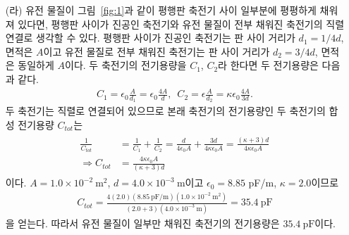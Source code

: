 \documentclass[tightenlines,floatfix,nofootinbib,superscriptaddress,fleqn]{revtex4-2}
\begin{document}
\begin{itemize}
  \item[(라)] 유전 물질이 그림~\ref{fig:1}과 같이 평행판 축전기 사이 일부분에 평평하게 
  채워져 있다면, 평행판 사이가 진공인
  축전기와 유전 물질이 전부 채워진 축전기의 직렬 연결로 생각할 수 있다. 평행판 사이가
  진공인 축전기는 판 사이 거리가 $d_1 = 1/4d$, 면적은 $A$이고 유전 물질로 전부 채워진 
  축전기는 판 사이 거리가 $d_2 = 3/4d$, 면적은 동일하게 $A$이다. 두 축전기의 전기용량을
  $C_1$, $C_2$라 한다면 두 전기용량은 다음과 같다.
  \begin{align}
    C_1 = \epsilon_0\frac{A}{d_1} = \epsilon_0\frac{4A}{d},\,\,\,
    C_2 = \epsilon \frac{A}{d_2} = \kappa\epsilon_0\frac{4A}{3d}.
  \end{align}
  두 축전기는 직렬로 연결되어 있으므로 본래 축전기의 전기용량인 두 축전기의 합성 전기용량
  $C_{tot}$는
  \begin{align}
    \begin{split}
      \frac{1}{C_{tot}} &= \frac{1}{C_1}+\frac{1}{C_2}
      =\frac{d}{4\epsilon_0 A}+ \frac{3d}{4\kappa\epsilon_0 A}      
      =\frac{(\kappa+3)d}{4\kappa\epsilon_0 A}  \\
      \Longrightarrow
      C_{tot} &= \frac{4\kappa\epsilon_0 A}{(\kappa+3)d}
    \end{split}
  \end{align}
  이다. $A=1.0\times 10^{-2}~\mathrm{m^2}$, 
  $d =4.0 \times 10^{-3}~\mathrm{m}$이고 $\epsilon_0=8.85$ pF/m, $\kappa=2.0$이므로
  \begin{align}
    C_{tot} = \frac{4(2.0)(8.85~\mathrm{pF/m}) (1.0\times 10^{-2}~\mathrm{m^2})}
    {(2.0+3)(4.0 \times 10^{-3}~\mathrm{m})}
    =35.4~\mathrm{pF}
  \end{align}
  을 얻는다. 따라서 유전 물질이 일부만 채워진 축전기의 전기용량은 $35.4~\mathrm{pF}$이다.

\end{itemize}
\end{document}
